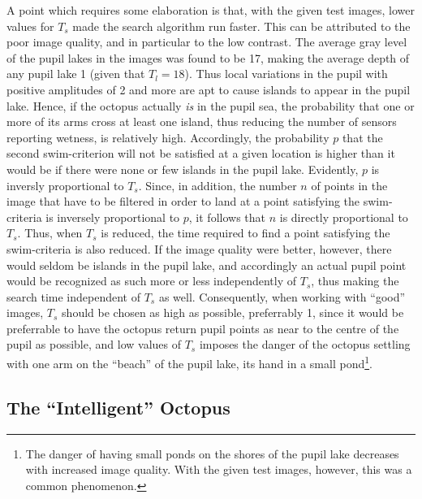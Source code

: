 A point which requires some elaboration is that, with the given test
images, lower values for $T_{s}$ made the search algorithm run faster.
This can be attributed to the poor image quality, and in particular to
the low contrast.  The average gray level of the pupil lakes in the
images was found to be 17, making the average depth of any pupil lake
1 (given that $T_{l}=18$).  Thus local variations in the pupil with
positive amplitudes of 2 and more are apt to cause islands to appear
in the pupil lake.  Hence, if the octopus actually {\em is\/} in the
pupil sea, the probability that one or more of its arms cross at least
one island, thus reducing the number of sensors reporting wetness, is
relatively high.  Accordingly, the probability $p$ that the second
swim-criterion will not be satisfied at a given location is higher
than it would be if there were none or few islands in the pupil lake.
Evidently, $p$ is inversly proportional to $T_{s}$.  Since, in
addition, the number $n$ of points in the image that have to be
filtered in order to land at a point satisfying the swim-criteria is
inversely proportional to $p$, it follows that $n$ is directly
proportional to $T_{s}$.  Thus, when $T_{s}$ is reduced, the time
required to find a point satisfying the swim-criteria is also reduced.
If the image quality were better, however, there would seldom be
islands in the pupil lake, and accordingly an actual pupil point would
be recognized as such more or less independently of $T_{s}$, thus
making the search time independent of $T_{s}$ as well.  Consequently,
when working with ``good'' images, $T_{s}$ should be chosen as high as
possible, preferrably 1, since it would be preferrable to have the
octopus return pupil points as near to the centre of the pupil as
possible, and low values of $T_{s}$ imposes the danger of the octopus
settling with one arm on the ``beach'' of the pupil lake, its hand in
a small pond\footnote{The danger of having small ponds on the shores
  of the pupil lake decreases with increased image quality.  With the
  given test images, however, this was a common phenomenon.}.

\subsection{The ``Intelligent'' Octopus}
\label{algo:seek:IQ}

